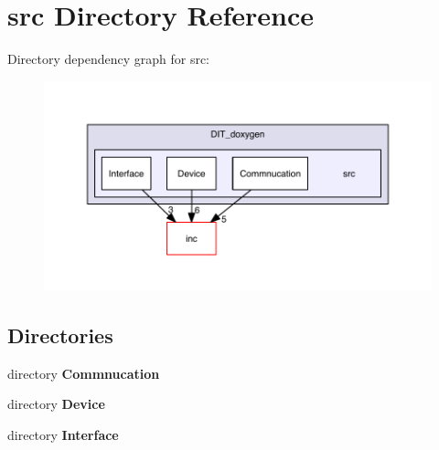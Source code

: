\section{src Directory Reference}
\label{dir_e423a974556823f5ed416556d6206c00}
Directory dependency graph for src\-:\nopagebreak
\begin{figure}[H]
\begin{center}
\leavevmode
\includegraphics[width=350pt]{dir_e423a974556823f5ed416556d6206c00_dep}
\end{center}
\end{figure}
\subsection*{Directories}
\begin{DoxyCompactItemize}
\item 
directory {\bf Commnucation}
\item 
directory {\bf Device}
\item 
directory {\bf Interface}
\end{DoxyCompactItemize}
